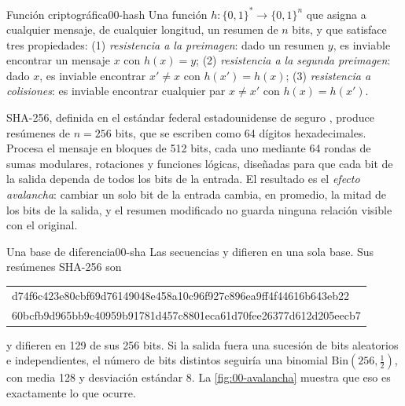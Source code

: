 \begin{definicion}{Función  criptográfica}{00-hash}
Una función $h:\{0,1\}^\ast\to\{0,1\}^{n}$ que asigna a cualquier mensaje, de cualquier longitud, un resumen de $n$ bits, y que satisface tres propiedades: (1) \emph{resistencia a la preimagen}: dado un resumen $y$, es inviable encontrar un mensaje $x$ con $h(x)=y$; (2) \emph{resistencia a la segunda preimagen}: dado $x$, es inviable encontrar $x'\ne x$ con $h(x')=h(x)$; (3) \emph{resistencia a colisiones}: es inviable encontrar cualquier par $x\ne x'$ con $h(x)=h(x')$.
\end{definicion}

SHA-256, definida en el estándar federal estadounidense de  seguro \parencite{c00-nist2015}, produce resúmenes de $n=256$ bits, que se escriben como 64 dígitos hexadecimales. Procesa el mensaje en bloques de 512 bits, cada uno mediante 64 rondas de sumas modulares, rotaciones y funciones lógicas, diseñadas para que cada bit de la salida dependa de todos los bits de la entrada. El resultado es el \emph{efecto avalancha}: cambiar un solo bit de la entrada cambia, en promedio, la mitad de los bits de la salida, y el resumen modificado no guarda ninguna relación visible con el original.

\begin{ejemplo}{Una base de diferencia}{00-sha}
Las secuencias  y  difieren en una sola base. Sus resúmenes SHA-256 son
\begin{center}
\small\ttfamily
\begin{tabular}{@{}l@{}}
d74f6c423e80cbf69d76149048e458a10c96f927c896ea9ff4f44616b643eb22\\
60bcfb9d965bb9c40959b91781d457c8801eca61d70fee26377d612d205eecb7
\end{tabular}
\end{center}
y difieren en 129 de sus 256 bits. Si la salida fuera una sucesión de bits aleatorios e independientes, el número de bits distintos seguiría una binomial $\mathrm{Bin}(256,\tfrac12)$, con media 128 y desviación estándar 8. La \cref{fig:00-avalancha} muestra que eso es exactamente lo que ocurre.
\end{ejemplo}

